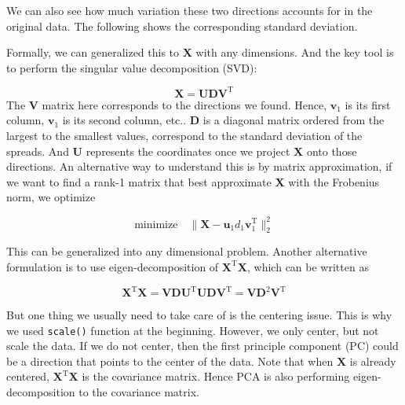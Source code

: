 \documentclass[
]{book}
\newenvironment{Shaded}{\begin{snugshade}}{\end{snugshade}}
\newcommand{\DocumentationTok}[1]{\textcolor[rgb]{0.56,0.35,0.01}{\textbf{\textit{#1}}}}
\newcommand{\FunctionTok}[1]{\textcolor[rgb]{0.13,0.29,0.53}{\textbf{#1}}}
\newcommand{\NormalTok}[1]{#1}
\newcommand{\SpecialCharTok}[1]{\textcolor[rgb]{0.81,0.36,0.00}{\textbf{#1}}}
\theoremstyle{definition}
\theoremstyle{definition}
\theoremstyle{definition}
\theoremstyle{definition}
\theoremstyle{remark}
\begin{document}
We can also see how much variation these two directions accounts for in the original data. The following shows the corresponding standard deviation.

\begin{Shaded}
\end{Shaded}

Formally, we can generalized this to \(\mathbf{X}\) with any dimensions. And the key tool is to perform the singular value decomposition (SVD):

\[\mathbf{X}= \mathbf{U}\mathbf{D}\mathbf{V}^\text{T}\]
The \(\mathbf{V}\) matrix here corresponds to the directions we found. Hence, \(\mathbf{v}_1\) is its first column, \(\mathbf{v}_1\) is its second column, etc.. \(\mathbf{D}\) is a diagonal matrix ordered from the largest to the smallest values, correspond to the standard deviation of the spreads. And \(\mathbf{U}\) represents the coordinates once we project \(\mathbf{X}\) onto those directions. An alternative way to understand this is by matrix approximation, if we want to find a rank-1 matrix that best approximate \(\mathbf{X}\) with the Frobenius norm, we optimize

\[\text{minimize} \quad \lVert \mathbf{X}- \mathbf{u}_1 d_1 \mathbf{v}_1^\text{T}\rVert_2^2\]

This can be generalized into any dimensional problem. Another alternative formulation is to use eigen-decomposition of \(\mathbf{X}^\text{T}\mathbf{X}\), which can be written as

\[\mathbf{X}^\text{T}\mathbf{X}= \mathbf{V}\mathbf{D}\mathbf{U}^\text{T}\mathbf{U}\mathbf{D}\mathbf{V}^\text{T}= \mathbf{V}\mathbf{D}^2 \mathbf{V}^\text{T}\]

But one thing we usually need to take care of is the centering issue. This is why we used \texttt{scale()} function at the beginning. However, we only center, but not scale the data. If we do not center, then the first principle component (PC) could be a direction that points to the center of the data. Note that when \(\mathbf{X}\) is already centered, \(\mathbf{X}^\text{T}\mathbf{X}\) is the covariance matrix. Hence PCA is also performing eigen-decomposition to the covariance matrix.
\end{document}
